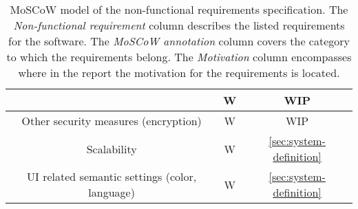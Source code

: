 \begin{table}[H]
{\begin{tabular}{ccc}
            & W
            & {WIP}
            \\ \midrule
            Other security measures (encryption)
            & W
            & {WIP}
            \\ \midrule
            Scalability
            & W
            & {\ul{\ref{sec:system-definition}}}
            \\ \midrule
            UI related semantic settings (color, language)
            & W
            & {\ul{\ref{sec:system-definition}}}
            \\ \bottomrule
        \end{tabular}%
    }
    \caption{MoSCoW model of the non-functional requirements specification.
    The \textit{Non-functional requirement} column describes the listed requirements for the software.
    The \textit{MoSCoW annotation} column covers the category to which the requirements belong.
    The \textit{Motivation} column encompasses where in the report the motivation for the requirements is located.
    }\label{tab:non-functional-requirements-specification}
\end{table}
